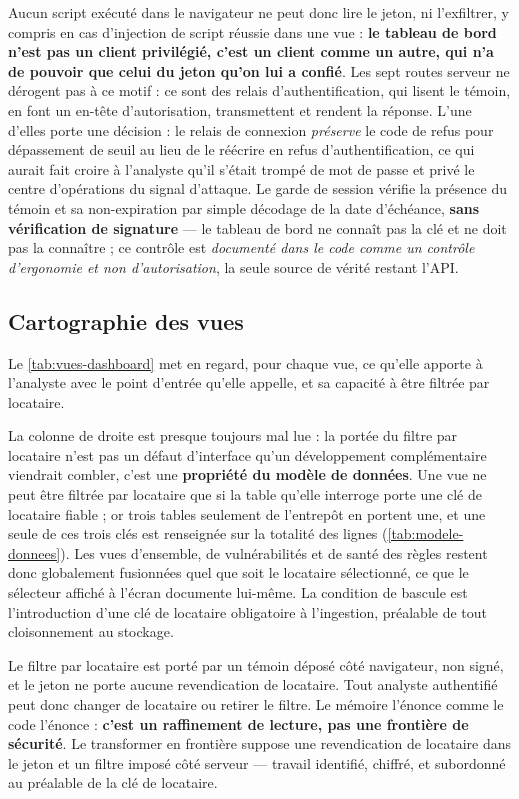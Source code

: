 Aucun script exécuté dans le navigateur ne peut donc lire le jeton, ni l'exfiltrer, y compris en cas
d'injection de script réussie dans une vue : \textbf{le tableau de bord n'est pas un client
privilégié, c'est un client comme un autre, qui n'a de pouvoir que celui du jeton qu'on lui a
confié}. Les sept routes serveur ne dérogent pas à ce motif : ce sont des relais
d'authentification, qui lisent le témoin, en font un en-tête d'autorisation, transmettent et rendent
la réponse. L'une d'elles porte une décision : le relais de connexion \emph{préserve} le code de
refus pour dépassement de seuil au lieu de le réécrire en refus d'authentification, ce qui aurait
fait croire à l'analyste qu'il s'était trompé de mot de passe et privé le centre d'opérations du
signal d'attaque. Le garde de session vérifie la présence du témoin et sa non-expiration par simple
décodage de la date d'échéance, \textbf{sans vérification de signature} --- le tableau de bord ne
connaît pas la clé et ne doit pas la connaître ; ce contrôle est \emph{documenté dans le code comme
un contrôle d'ergonomie et non d'autorisation}, la seule source de vérité restant l'API.

\subsection{Cartographie des vues}

Le \cref{tab:vues-dashboard} met en regard, pour chaque vue, ce qu'elle apporte à
l'analyste avec le point d'entrée qu'elle appelle, et sa capacité à être filtrée par locataire.


La colonne de droite est presque toujours mal lue : la portée du filtre par locataire n'est pas un
défaut d'interface qu'un développement complémentaire viendrait combler, c'est une \textbf{propriété
du modèle de données}. Une vue ne peut être filtrée par
locataire que si la table qu'elle interroge porte une clé de locataire fiable ; or trois tables
seulement de l'entrepôt en portent une, et une seule de ces trois clés est renseignée sur la
totalité des lignes (\cref{tab:modele-donnees}). Les vues
d'ensemble, de vulnérabilités et de santé des règles restent donc globalement fusionnées quel que
soit le locataire sélectionné, ce que le sélecteur affiché à l'écran documente lui-même. La
condition de bascule est l'introduction d'une clé de locataire obligatoire à l'ingestion, préalable
de tout cloisonnement au stockage.

\begin{alertbox}[boxsep=1pt, left=4pt, right=4pt, top=3pt, bottom=3pt]
Le filtre par locataire est porté par un témoin déposé côté navigateur, non signé, et le jeton ne
porte aucune revendication de locataire. Tout analyste authentifié peut donc changer de locataire
ou retirer le filtre. Le mémoire l'énonce comme le code l'énonce : \textbf{c'est un raffinement
de lecture, pas une frontière de sécurité}. Le transformer en frontière suppose une revendication
de locataire dans le jeton et un filtre imposé côté serveur --- travail identifié, chiffré, et
subordonné au préalable de la clé de locataire.
\end{alertbox}

